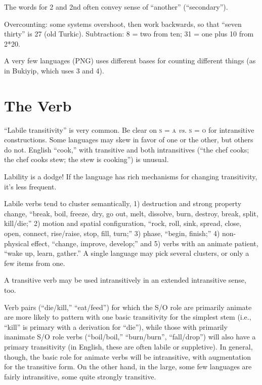 \documentclass[11pt]{article}
\newcommand{\I}[1]{\textsc{#1}}   %
\begin{document}
The words for 2 and 2nd often convey sense of ``another''
(``secondary''). 

Overcounting: some systems overshoot, then work backwards, so that
``seven thirty'' is 27 (old Turkic).  Subtraction: 8 = two from ten;
31 = one plus 10 from 2*20.

A very few languages (PNG) uses different bases for counting different
things (as in Bukiyip, which uses 3 and 4).


\section{The Verb}
``Labile transitivity'' is very common.  Be clear on \I{s = a}
\textit{vs.} \I{s = o} for intransitive constructions.  Some languages
may skew in favor of one or the other, but others do not.  English
``cook,'' with transitive and both intransitives (``the chef cooks;
the chef cooks stew; the stew is cooking'') is unusual.

Lability is a dodge!  If the language has rich mechanisms for changing
transitivity, it's less frequent.

Labile verbs tend to cluster semantically, 1) destruction and strong
property change, ``break, boil, freeze, dry, go out, melt, dissolve,
burn, destroy, break, split, kill/die;'' 2) motion and spatial
configuration, ``rock, roll, sink, spread, close, open, connect,
rise/raise, stop, fill, turn;'' 3) phase, ``begin, finish;'' 4)
non-physical effect, ``change, improve, develop;'' and 5) verbs with
an animate patient, ``wake up, learn, gather.''  A single language may
pick several clusters, or only a few items from one.

A transitive verb may be used intransitively in an extended
intransitive sense, too.

Verb pairs (``die/kill,'' ``eat/feed'') for which the S/O role are
primarily animate are more likely to pattern with one basic
transitivity for the simplest stem (i.e., ``kill'' is primary with a
derivation for ``die''), while those with primarily inanimate S/O role
verbs (``boil/boil,'' ``burn/burn'', ``fall/drop'') will also have a
primary transitivity (in English, these are often labile or
suppletive).  In general, though, the basic role for animate verbs
will be intransitive, with augmentation for the transitive form.  On
the other hand, in the large, some few languages are fairly
intransitive, some quite strongly transitive.
\end{document}
